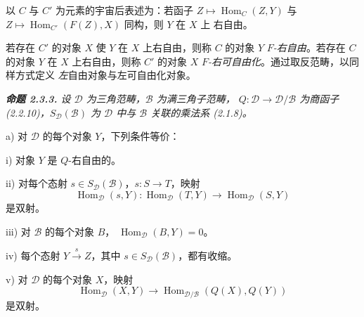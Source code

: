 \clearpage
{}%
\begingroup
\small
\setlength{\parskip}{0pt}%
\setlength{\emergencystretch}{1.5em}%
\setlength{\abovedisplayskip}{3pt plus 1pt minus 1pt}%
\setlength{\belowdisplayskip}{3pt plus 1pt minus 1pt}%

\noindent 以 $C$ 与 $C'$ 为元素的宇宙后表述为：若函子
$Z\longmapsto\operatorname{Hom}_C(Z,Y)$ 与
$Z\longmapsto\operatorname{Hom}_{C'}(F(Z),X)$ 同构，则 $Y$ 在 $X$ 上
右自由。

若存在 $C'$ 的对象 $X$ 使 $Y$ 在 $X$ 上右自由，则称 $C$ 的对象 $Y$
\emph{$F$-右自由}。若存在 $C$ 的对象 $Y$ 在 $X$ 上右自由，则称
$C'$ 的对象 $X$ \emph{$F$-右可自由化}。通过取反范畴，以同样方式定义
\emph{左}自由对象与左可自由化对象。

\medskip\begingroup\itshape
\noindent\textbf{命题 2.3.3.}\quad
设 $\mathcal D$ 为三角范畴，$\mathcal B$ 为满三角子范畴，
$Q\colon\mathcal D\longrightarrow\mathcal D/\mathcal B$ 为商函子
(2.2.10)，$S_{\mathcal D}(\mathcal B)$ 为 $\mathcal D$ 中与
$\mathcal B$ 关联的乘法系 (2.1.8)。

\par\noindent a) 对 $\mathcal D$ 的每个对象 $Y$，下列条件等价：
\par\noindent\hspace{1.2em}i) 对象 $Y$ 是 $Q$-右自由的。
\par\noindent\hspace{1.2em}ii) 对每个态射
$s\in S_{\mathcal D}(\mathcal B)$，$s\colon S\longrightarrow T$，映射
\[
  \operatorname{Hom}_{\mathcal D}(s,Y)\colon
  \operatorname{Hom}_{\mathcal D}(T,Y)\longrightarrow
  \operatorname{Hom}_{\mathcal D}(S,Y)
\]
是双射。
\par\noindent\hspace{1.2em}iii) 对 $\mathcal B$ 的每个对象 $B$，
$\operatorname{Hom}_{\mathcal D}(B,Y)=0$。
\par\noindent\hspace{1.2em}iv) 每个态射 $Y\xrightarrow{s}Z$，其中
$s\in S_{\mathcal D}(\mathcal B)$，都有收缩。
\par\noindent\hspace{1.2em}v) 对 $\mathcal D$ 的每个对象 $X$，映射
\[
  \operatorname{Hom}_{\mathcal D}(X,Y)\longrightarrow
  \operatorname{Hom}_{\mathcal D/\mathcal B}(Q(X),Q(Y))
\]
是双射。

